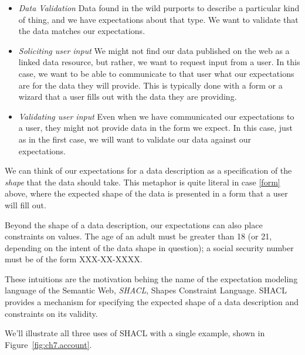 \begin{itemize}
    \item \emph{Data Validation} \label{datav} Data found in the wild purports to describe a particular kind of thing, and we have
    expectations about that type.  We want to validate that the data matches our expectations.

  \item \emph{Soliciting user input} \label{form}
      We might not find our data published on the web as a linked data resource, but
      rather, we want to request input from a user.  In this case, we want to be able to communicate to that user what
      our expectations are for the data they will provide.  This is typically done with a form or a wizard that a user
      fills out with the data they are providing.

    \item \emph{Validating user input} \label{userv} Even when we have communicated our expectations to a user,
      they might not provide 
      data in the form we expect.  In this case, just as in the first case, we will want to validate our data against our
      expectations.
\end{itemize}

We can think of our expectations for a data description as a specification of the \emph{shape} that the data should take.  This metaphor is quite literal in case \ref{form} above, where the expected shape of the data is presented in a form that a user will fill out.  

Beyond the shape of a data description, our expectations can also place constraints on values.  The age of an adult must be greater than 18 (or 21, depending on the intent of the data shape in question);  a social security number must be of the form XXX-XX-XXXX.

These intuitions are the motivation behing the name of the expectation modeling language of the Semantic Web, \emph{SHACL}, Shapes Constraint Language.  SHACL provides a mechanism for specifying the expected shape of a data description and constraints on its validity.

We'll illustrate all three uses of SHACL with a single example, shown in Figure~\ref{fig:ch7.account}.

